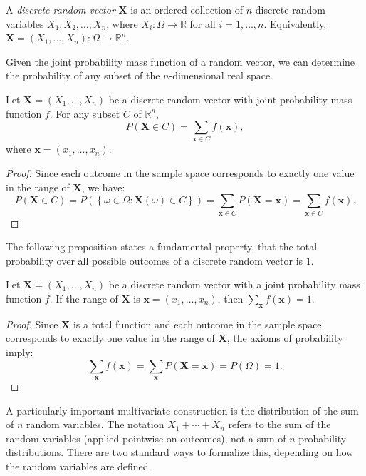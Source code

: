 \begin{definition}
A \emph{discrete random vector} $\mathbf{X}$ is an ordered collection of $n$ discrete random variables $X_1, X_2, \ldots, X_n$, where $X_i : \Omega \rightarrow \mathbb{R}$ for all $i=1, \ldots, n$. Equivalently, $\mathbf{X} = (X_1, \ldots, X_n):\Omega \to \mathbb{R}^n$.
\end{definition}

Given the joint probability mass function of a random vector, we can determine the probability of any subset of the $n$-dimensional real space.

\begin{proposition}
Let $\mathbf{X} = (X_{1}, \ldots, X_{n})$ be a discrete random vector with joint probability mass function $f$. For any subset $C$ of $\mathbb{R}^n$,
\[
P(\mathbf{X} \in C) = \sum_{\mathbf{x} \in C} f(\mathbf{x}),
\]
where $\mathbf{x} = (x_{1}, \ldots, x_{n})$.
\end{proposition}
\begin{proof}
Since each outcome in the sample space corresponds to exactly one value in the range of $\mathbf{X}$, we have:
\[
P(\mathbf{X} \in C) = P \left( \left\{ \omega \in \Omega : \mathbf{X}(\omega) \in C \right\} \right) = \sum_{\mathbf{x} \in C} P(\mathbf{X} = \mathbf{x}) = \sum_{\mathbf{x} \in C} f(\mathbf{x}).
\]
\end{proof}

The following proposition states a fundamental property, that the total probability over all possible outcomes of a discrete random vector is $1$.

\begin{proposition}
Let $\mathbf{X}=\left(X_{1}, \ldots, X_{n}\right)$ be a discrete random vector with a joint probability mass function $f$. If the range of $\mathbf{X}$ is $\mathbf{x} = (x_{1}, \ldots, x_{n})$, then $\sum_{\mathbf{x}}f\left(\mathbf{x}\right)=1$.
\end{proposition}
\begin{proof}
Since $\mathbf{X}$ is a total function and each outcome in the sample space corresponds to exactly one value in the range of $\mathbf{X}$, the axioms of probability imply:
\[
\sum_{\mathbf{x}} f(\mathbf{x}) = \sum_{\mathbf{x}} P(\mathbf{X} = \mathbf{x}) = P(\Omega) = 1.
\]
\end{proof}

A particularly important multivariate construction is the distribution of the sum of $n$ random variables. The notation $X_1 + \cdots + X_n$ refers to the sum of the random variables (applied pointwise on outcomes), not a sum of $n$ probability distributions. There are two standard ways to formalize this, depending on how the random variables are defined.

